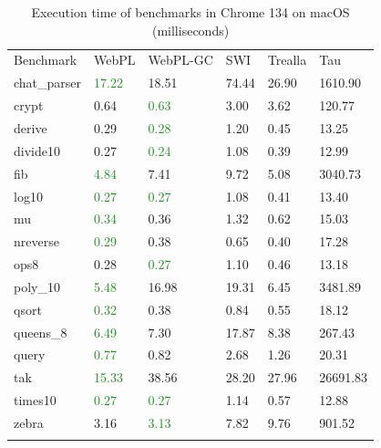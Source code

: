 \begin{table}[H]
\centering
{}
\begin{tabular}{llllll}
\addlinespace\hline\addlinespace
Benchmark & WebPL & WebPL-GC & SWI & Trealla & Tau \\
\addlinespace\hline\addlinespace
chat\_parser  & \textcolor{ForestGreen}{17.22}  &  18.51  &  74.44  &  26.90  &  1610.90  \\
crypt        &   0.64  &   \textcolor{ForestGreen}{0.63}  &   3.00  &   3.62  &   120.77  \\
derive       &   0.29  &   \textcolor{ForestGreen}{0.28}  &   1.20  &   0.45  &    13.25  \\
divide10     &   0.27  &   \textcolor{ForestGreen}{0.24}  &   1.08  &   0.39  &    12.99  \\
fib          &   \textcolor{ForestGreen}{4.84}  &   7.41  &   9.72  &   5.08  &  3040.73  \\
log10        &   \textcolor{ForestGreen}{0.27}  &   \textcolor{ForestGreen}{0.27}  &   1.08  &   0.41  &    13.40  \\
mu           &   \textcolor{ForestGreen}{0.34}  &   0.36  &   1.32  &   0.62  &    15.03  \\
nreverse     &   \textcolor{ForestGreen}{0.29}  &   0.38  &   0.65  &   0.40  &    17.28  \\
ops8         &   0.28  &   \textcolor{ForestGreen}{0.27}  &   1.10  &   0.46  &    13.18  \\
poly\_10      &   \textcolor{ForestGreen}{5.48}  &  16.98  &  19.31  &   6.45  &  3481.89  \\
qsort        &   \textcolor{ForestGreen}{0.32}  &   0.38  &   0.84  &   0.55  &    18.12  \\
queens\_8     &   \textcolor{ForestGreen}{6.49}  &   7.30  &  17.87  &   8.38  &   267.43  \\
query        &  \textcolor{ForestGreen}{0.77}  &   0.82  &   2.68  &   1.26  &    20.31  \\
tak          &  \textcolor{ForestGreen}{15.33}  &  38.56  &  28.20  &  27.96  & 26691.83  \\
times10      &   \textcolor{ForestGreen}{0.27}  &   \textcolor{ForestGreen}{0.27}  &   1.14  &   0.57  &    12.88  \\
zebra        &   3.16  &   \textcolor{ForestGreen}{3.13}  &   7.82  &   9.76  &   901.52  \\
\addlinespace\hline\addlinespace
\end{tabular}
\caption{Execution time of benchmarks in Chrome 134 on macOS (milliseconds)}
\label{tab:chrome-time}
\end{table}

